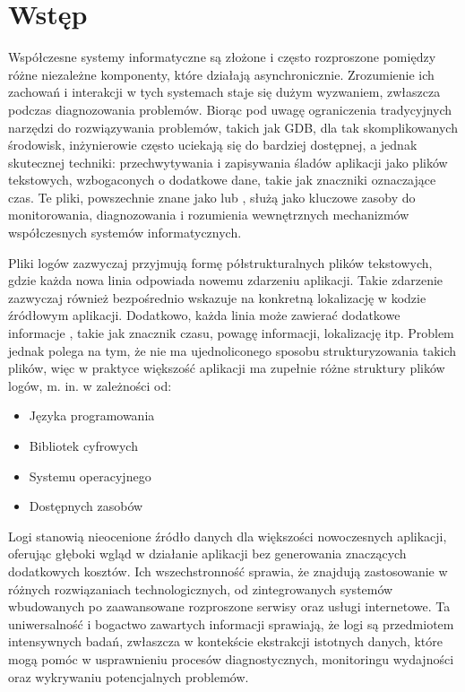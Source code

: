 \chapter{Wstęp}

Współczesne systemy informatyczne są złożone i często rozproszone pomiędzy różne niezależne komponenty, które działają asynchronicznie.
Zrozumienie ich zachowań i interakcji w tych systemach staje się dużym wyzwaniem, zwłaszcza podczas diagnozowania problemów.
Biorąc pod uwagę ograniczenia tradycyjnych narzędzi do rozwiązywania problemów, takich jak GDB, dla tak skomplikowanych środowisk,
inżynierowie często uciekają się do bardziej dostępnej, a jednak skutecznej techniki:
przechwytywania i zapisywania śladów aplikacji jako plików tekstowych, wzbogaconych o dodatkowe dane, takie jak znaczniki oznaczające czas.
Te pliki, powszechnie znane jako  lub , służą jako kluczowe zasoby do monitorowania, diagnozowania i rozumienia wewnętrznych mechanizmów współczesnych systemów informatycznych.

Pliki logów zazwyczaj przyjmują formę półstrukturalnych plików tekstowych, gdzie
każda nowa linia odpowiada nowemu zdarzeniu aplikacji.
Takie zdarzenie zazwyczaj również bezpośrednio wskazuje na konkretną lokalizację
w kodzie źródłowym aplikacji.
Dodatkowo, każda linia może zawierać dodatkowe informacje , takie jak znacznik
czasu, powagę informacji, lokalizację itp.
Problem jednak polega na tym, że nie ma ujednoliconego sposobu strukturyzowania
takich plików, więc w praktyce większość aplikacji ma zupełnie różne struktury
plików logów\cite{LogTypes}, m. in. w zależności od:

\begin{itemize}
  \item Języka programowania
  \item Bibliotek cyfrowych
  \item Systemu operacyjnego
  \item Dostępnych zasobów
\end{itemize}

Logi stanowią nieocenione źródło danych dla
większości nowoczesnych aplikacji, oferując głęboki wgląd w działanie aplikacji
bez generowania znaczących dodatkowych kosztów.
Ich wszechstronność sprawia, że znajdują zastosowanie w różnych rozwiązaniach
technologicznych, od zintegrowanych systemów wbudowanych po zaawansowane
rozproszone serwisy oraz usługi internetowe.
Ta uniwersalność i bogactwo zawartych informacji sprawiają, że logi są
przedmiotem intensywnych badań, zwłaszcza w kontekście ekstrakcji istotnych
danych, które mogą pomóc w usprawnieniu procesów diagnostycznych, monitoringu
wydajności oraz wykrywaniu potencjalnych problemów.

